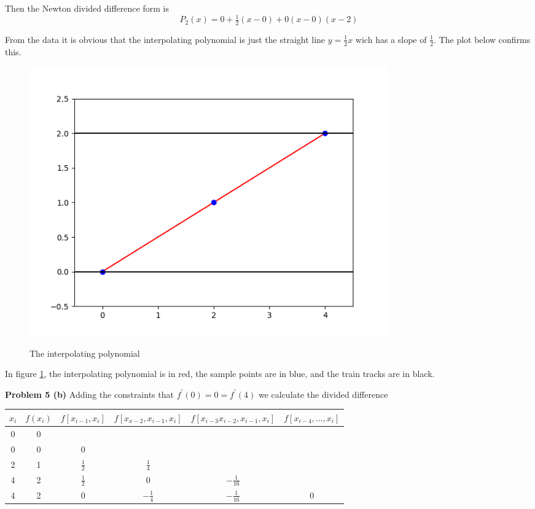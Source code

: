 \documentclass[12pt]{article}
\newcommand{\problem}[1]{\hspace{-4 ex} \large \textbf{Problem #1} }
\begin{document}
	Then the Newton divided difference form is
	$$
	P_2(x) = 0 + \tfrac{1}{2}(x-0) + 0(x-0)(x-2)
	$$
	
	From the data it is obvious that the interpolating polynomial is just the straight line $y=\tfrac{1}{2}x$ wich has a slope of $\tfrac{1}{2}$. The plot below confirms this.	
	\begin{figure}[H]
		\caption{The interpolating polynomial}
		\includegraphics[width=0.75\textwidth]{hw4_figure_5}
		\centering
		\label{fig:p5a}
	\end{figure}
	In figure \ref{fig:p5a}, the interpolating polynomial is in red, the sample points are in blue, and the train tracks are in black.
	
\problem{5 (b)} Adding the constraints that $f^\prime(0) = 0 = f^\prime(4)$ we calculate the divided difference

	\begin{center}
		\begin{tabular}{|c|c|c|c|c|c|}\hline
			$x_i$ & $f(x_i)$ & $f[x_{i-1},x_i]$ & $f[x_{x-2}, x_{i-1}, x_i]$ & $f[ x_{i-3}x_{i-2}, x_{i-1}, x_i]$ & $f[ x_{i-4},\dots, x_i]$ \\ \hline
			0 &0 & & & & \\ \hline
			0 &0 & 0 & & & \\ \hline
			2 &1 & $\tfrac{1}{2}$ & $\tfrac{1}{4}$ & & \\ \hline
			4 &2 & $\tfrac{1}{2}$ & 0 & $-\tfrac{1}{16}$ & \\ \hline
			4 &2 & 0 &  $-\tfrac{1}{4}$ & $-\tfrac{1}{16}$ & 0 \\ \hline
		\end{tabular}
	\end{center}
\end{document}
